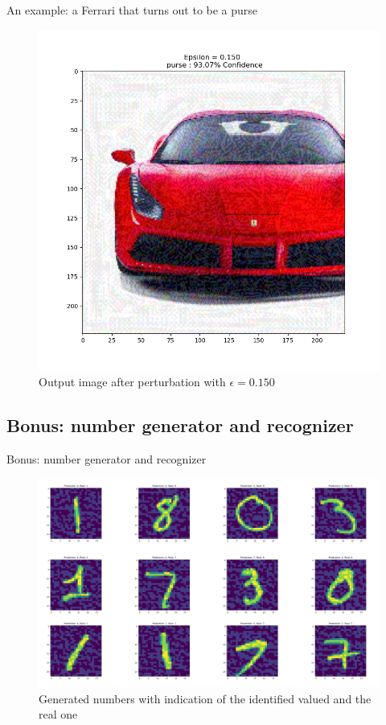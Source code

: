 \documentclass[8pt]{beamer}
\begin{document}
\begin{frame}{An example: a Ferrari that turns out to be a purse}
\begin{figure} 
    \includegraphics[scale=0.3]{images/output_3.png}
    \vspace*{-5mm}
    \caption{Output image after perturbation with $\epsilon=0.150$}
\end{figure}
\end{frame}

\subsection{Bonus: number generator and recognizer}
\begin{frame}{Bonus: number generator and recognizer}
\begin{figure} 
    \includegraphics[scale=0.5]{images/immagini_matrix/matrice_numeri.png}
    \vspace*{-3mm}
    \caption{Generated numbers with indication of the identified valued and the real one}
\end{figure}
\end{frame}
\end{document}
